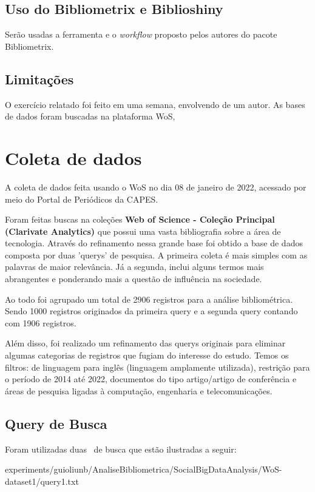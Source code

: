 \subsection{Uso do Bibliometrix e Biblioshiny}
Serão usadas a ferramenta e o \textit{workflow} proposto pelos autores do pacote Bibliometrix.

\subsection{Limitações} O exercício relatado foi feito em uma semana, envolvendo de um autor. As bases de dados foram buscadas na plataforma WoS,


\section{Coleta de dados\label{MASSA:coleta}}

A coleta de dados feita usando o WoS no dia 08 de janeiro de 2022, acessado por meio do Portal de Periódicos da CAPES.

Foram feitas buscas na coleções \textbf{Web of Science - Coleção Principal (Clarivate Analytics) } que possui uma vasta bibliografia sobre a área de tecnologia. Através do refinamento nessa grande base foi obtido a base de dados composta por duas 'querys' de pesquisa. A primeira coleta é mais simples com as palavras de maior relevância. Já a segunda, inclui alguns termos mais abrangentes e ponderando mais a questão de influência na sociedade. 

Ao todo foi agrupado um total de 2906 registros para a análise bibliométrica. Sendo 1000 registros originados da primeira query e a segunda query contando com 1906 registros.

Além disso, foi realizado um refinamento das querys originais para eliminar algumas categorias de registros que fugiam do interesse do estudo. Temos os filtros: de linguagem para inglês (linguagem amplamente utilizada), restrição para o período de 2014 até 2022, documentos do tipo artigo/artigo de conferência e áreas de pesquisa ligadas à computação, engenharia e telecomunicações.

\subsection{Query de Busca}

Foram utilizadas duas \querys\ de busca que estão ilustradas a seguir: %


{experiments/guioliunb/AnaliseBibliometrica/SocialBigDataAnalysis/WoS-dataset1/query1.txt}

